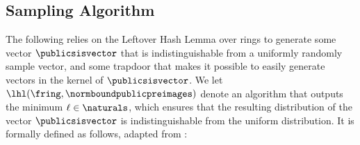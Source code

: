 

\subsection{Sampling Algorithm}

The following relies on the Leftover Hash Lemma over rings to generate some vector $\publicsisvector$ that is indistinguishable from a uniformly randomly sample vector, and some trapdoor that makes it possible to easily generate vectors in the kernel of $\publicsisvector$.  We let $\lhl(\fring, \normboundpublicpreimages)$ denote an algorithm that outputs the minimum $\ell \in \naturals$, which ensures that the resulting distribution of the vector $\publicsisvector$ is indistinguishable from the uniform distribution. It is formally defined as follows, adapted from \cite{GPV08,EC:MicPei12,GM18,C:ACLMT22}:

